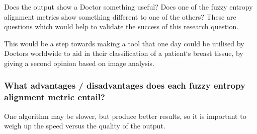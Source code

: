 Does the output show a Doctor something useful? Does one of the fuzzy entropy alignment metrics show something different to one of the others? These are questions which would help to validate the success of this research question.

This would be a step towards making a tool that one day could be utilised by Doctors worldwide to aid in their classification of a patient`s breast tissue, by giving a second opinion based on image analysis.

\subsubsection{What advantages / disadvantages does each fuzzy entropy alignment metric entail?}

One algorithm may be slower, but produce better results, so it is important to weigh up the speed versus the quality of the output.
